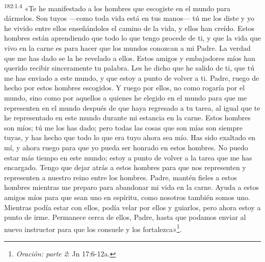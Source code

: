 \par 
\textsuperscript{182:1.4} «Te he manifestado a los hombres que escogiste en el mundo para dármelos. Son tuyos ---como toda vida está en tus manos--- tú me los diste y yo he vivido entre ellos enseñándoles el camino de la vida, y ellos han creído. Estos hombres están aprendiendo que todo lo que tengo procede de ti, y que la vida que vivo en la carne es para hacer que los mundos conozcan a mi Padre. La verdad que me has dado se la he revelado a ellos. Estos amigos y embajadores míos han querido recibir sinceramente tu palabra. Les he dicho que he salido de ti, que tú me has enviado a este mundo, y que estoy a punto de volver a ti. Padre, ruego de hecho por estos hombres escogidos. Y ruego por ellos, no como rogaría por el mundo, sino como por aquellos a quienes he elegido en el mundo para que me representen en el mundo después de que haya regresado a tu tarea, al igual que te he representado en este mundo durante mi estancia en la carne. Estos hombres son míos; tú me los has dado; pero todas las cosas que son mías son siempre tuyas, y has hecho que todo lo que era tuyo ahora sea mío. Has sido exaltado en mí, y ahora ruego para que yo pueda ser honrado en estos hombres. No puedo estar más tiempo en este mundo; estoy a punto de volver a la tarea que me has encargado. Tengo que dejar atrás a estos hombres para que nos representen y representen a nuestro reino entre los hombres. Padre, mantén fieles a estos hombres mientras me preparo para abandonar mi vida en la carne. Ayuda a estos amigos míos para que sean uno en espíritu, como nosotros también somos uno. Mientras podía estar con ellos, podía velar por ellos y guiarlos, pero ahora estoy a punto de irme. Permanece cerca de ellos, Padre, hasta que podamos enviar al nuevo instructor para que los consuele y los fortalezca»\footnote{\textit{Oración: parte 2}: Jn 17:6-12a.}.

